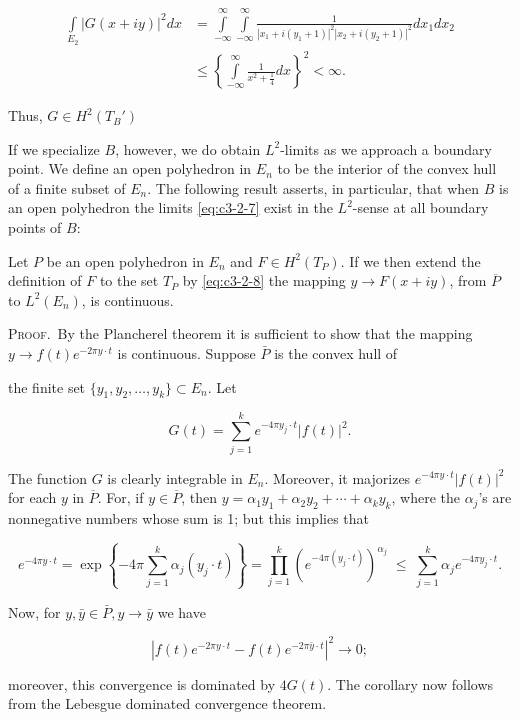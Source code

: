 \[
\begin{aligned}\int\limits_{E_{2}}|G(x+iy)|^{2}dx&=\int\limits_{-\infty}^{\infty}\int\limits_{-\infty}^{\infty}\frac{1}{|x_{1}+i(y_{1}+1)|^{2}|x_{2}+i(y_{2}+1)|^{2}}dx_{1}dx_{2}\\&\leq\left\{\int\limits_{-\infty}^{\infty}\frac{1}{x^{2}+\frac{1}{4}}dx\right\}^{2}<\infty.\end{aligned}
\]

Thus, $G \in H^2(T_B')$

If we specialize $B$, however, we do obtain $L^{2}$-limits as we approach a boundary point. We define an open polyhedron in $E_n$ to be the interior of the convex hull of a finite subset of $E_n$. The following result asserts, in particular, that when $B$ is an open polyhedron the limits \eqref{eq:c3-2-7} exist in the $L^{2}$-sense at all boundary points of $B$:

\begin{corollary}
\label{cor:c3-2-9}
Let $P$ be an open polyhedron in $E_n$ and $F \in H^2(T_P)$. If we then extend the definition of $F$ to the set $T_P$ by \eqref{eq:c3-2-8} the mapping $y \to F(x + iy)$, from $\overline{P}$ to $L^2(E_n)$, is continuous.
\end{corollary}

\textsc{Proof.}\ By the Plancherel theorem it is sufficient to show that the mapping $y \to f(t)e^{-2\pi y\cdot t}$ is continuous. Suppose $\bar{P}$ is the convex hull of

the finite set $\{y_1, y_2, \ldots, y_k\} \subset E_n$. Let

\[
G(t)=\sum_{j=1}^{k}e^{-4\pi y_{j}\cdot t}|f(t)|^{2}.
\]

The function $G$ is clearly integrable in $E_n$. Moreover, it majorizes $e^{-4\pi y \cdot t}|f(t)|^2$ for each $y$ in $\overline{P}$. For, if $y \in \overline{P}$, then $y = \alpha_1 y_1 + \alpha_2 y_2 + \cdots + \alpha_k y_k$, where the $\alpha_j$'s are nonnegative numbers whose sum is 1; but this implies that

\[
e^{-4\pi y\cdot t}=\exp\left\{-4\pi\sum_{j=1}^{k}\alpha_{j}(y_{j}\cdot t)\right\}=\prod_{j=1}^{k}(e^{-4\pi(y_{j}\cdot t)})^{\alpha_{j}}\;\leq\;\sum_{j=1}^{k}\alpha_{j}e^{-4\pi y_{j}\cdot t}.
\]

Now, for $y, \bar{y} \in \bar{P}, y \to \bar{y}$ we have

\[
|f(t)e^{-2\pi y\cdot t}-f(t)e^{-2\pi\bar{y}\cdot t}|^{2}\to0;
\]

moreover, this convergence is dominated by $4G(t)$. The corollary now follows from the Lebesgue dominated convergence theorem.

